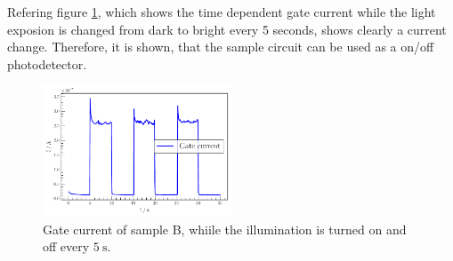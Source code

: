 Refering figure \ref{fig:dynamic}, which shows the time dependent gate current while the light exposion is changed from dark to bright every 5 seconds, shows clearly a current change.
Therefore, it is shown, that the sample circuit can be used as a on/off photodetector.

\begin{figure}
    \captionsetup{width=0.9\linewidth}
    \includegraphics[width=0.5\textwidth]{plots/dynamic.pdf}
  \caption{Gate current of sample B, whiile the illumination is turned on and off every $\SI{5}{\s}$.}
    \label{fig:dynamic}
\end{figure}

